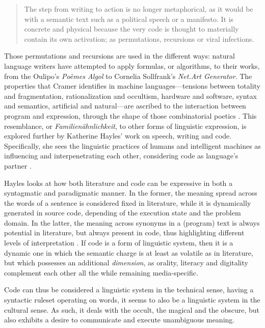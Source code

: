 \begin{quote}
  The step from writing to action is no longer metaphorical, as it would be with a semantic text such as a political speech or a manifesto. It is concrete and physical because the very code is thought to materially contain its own activation; as permutations, recursions or viral infections. \citep{cramer_words_2003}
\end{quote}

Those permutations and recursions are used in the different ways: natural language writers have attempted to apply formulas, or algorithms, to their works, from the Oulipo's \emph{Poèmes Algol} to Cornelia Sollfrank's \emph{Net.Art Generator}. The properties that Cramer identifies in machine languages—tensions between totality and fragmentation, rationalization and occultism, hardware and software, syntax and semantics, artificial and natural—are ascribed to the interaction between program and expression, through the shape of those combinatorial poetics \citep{cramer_words_2003}. This resemblance, or \emph{Familienähnlichkeit}, to other forms of linguistic expression, is explored further by Katherine Hayles' work on speech, writing and code. Specifically, she sees the linguistic practices of humans and intelligent machines as influencing and interpenetrating each other, considering code as language's partner \citep{hayles_print_2004}.

Hayles looks at how both literature and code can be expressive in both a syntagmatic and paradigmatic manner. In the former, the meaning spread across the words of a sentence is considered fixed in literature, while it is dynamically generated in source code, depending of the execution state and the problem domain. In the latter, the meaning across synonyms in a (program) text is always potential in literature, but always present in code, thus highlighting different levels of interpretation \citep{hayles_print_2004}. If code is a form of linguistic system, then it is a dynamic one in which the semantic charge is at least as volatile as in literature, but which possesses an additional \emph{dimension}, as orality, literacy and digitality complement each other all the while remaining media-specific.

Code can thus be considered a linguistic system in the technical sense, having a syntactic ruleset operating on words, it seems to also be a linguistic system in the cultural sense. As such, it deals with the occult, the magical and the obscure, but also exhibits a desire to communicate and execute unambiguous meaning.

